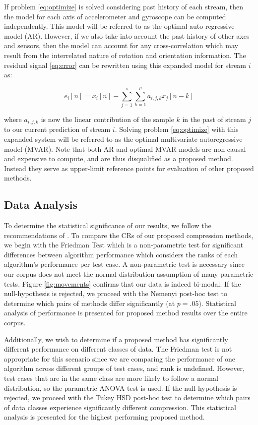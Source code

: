 \documentclass[journal]{IEEEtran}
\begin{document}
If problem \eqref{eq:optimize} is solved considering past history of each stream, then the model for each axis of accelerometer and gyroscope can be computed independently. This model will be referred to as the optimal auto-regressive model (AR). However, if we also take into account the past history of other axes and sensors, then the model can account for any cross-correlation which may result from the interrelated nature of rotation and orientation information. The residual signal \eqref{eq:error} can be rewritten using this expanded model for stream $i$ as:

\begin{equation*}
e_i[n] = x_i[n] - \sum_{j=1}^{s}\sum_{k=1}^{p}a_{i,j,k}x_j[n-k]
\end{equation*}

where $a_{i,j,k}$ is now the linear contribution of the sample $k$ in the past of stream $j$ to our current prediction of stream $i$. Solving problem \eqref{eq:optimize} with this expanded system will be referred to as the optimal multivariate autoregressive model (MVAR). Note that both AR and optimal MVAR models are non-causal and expensive to compute, and are thus disqualified as a proposed method. Instead they serve as upper-limit reference points for evaluation of other proposed methods.

\subsection{Data Analysis}

To determine the statistical significance of our results, we follow the recommendations of \cite{Demsar2006}. To compare the CRs of our proposed compression methods, we begin with the Friedman Test \cite{Friedman1937} which is a non-parametric test for significant differences between algorithm performance which considers the ranks of each algorithm's performance per test case. A non-parametric test is necessary since our corpus does not meet the normal distribution assumption of many parametric tests. Figure \ref{fig:movements} confirms that our data is indeed bi-modal. If the null-hypothesis is rejected, we proceed with the Nemenyi post-hoc test \cite{Nemenyi1963} to determine which pairs of methods differ significantly (at $p=.05$). Statistical analysis of performance is presented for proposed method results over the entire corpus.

Additionally, we wish to determine if a proposed method has significantly different performance on different classes of data. The Friedman test is not appropriate for this scenario since we are comparing the performance of one algorithm across different groups of test cases, and rank is undefined. However, test cases that are in the same class are more likely to follow a normal distribution, so the parametric ANOVA test is used\cite{Fisher1959}. If the null-hypothesis is rejected, we proceed with the Tukey HSD post-hoc test \cite{Tukey1949} to determine which pairs of data classes experience significantly different compression. This statistical analysis is presented for the highest performing proposed method.
\end{document}
